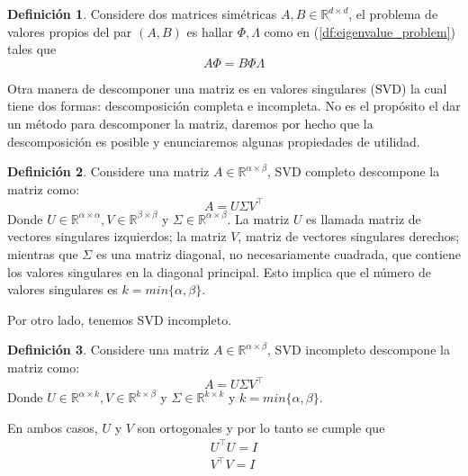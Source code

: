 \documentclass{article}
\numberwithin{equation}{section}
\theoremstyle{remark}
\theoremstyle{definition}
\newtheorem{definition}{Definición}
\theoremstyle{remark}
\theoremstyle{remark}
\begin{document}
\begin{definition}
    \label{df:generalized_eigenvalue_problem}
    Considere dos matrices simétricas $A, B \in \mathbb{R}^{d \times d}$, el problema de 
    valores propios del par $(A, B)$ es hallar $\Phi, \Lambda$ como en (\ref{df:eigenvalue_problem})
    tales que
    \begin{equation}
    \label{eq:generalized_eigenvalue_problem}
        A \Phi = B \Phi \Lambda
    \end{equation}
\end{definition}

Otra manera de descomponer una matriz es en valores singulares (SVD) la cual tiene dos formas:
descomposición completa e incompleta. No es el propósito el dar un método para descomponer la matriz,
daremos por hecho que la descomposición es posible y enunciaremos algunas propiedades de utilidad.

\begin{definition}
    \label{df:complete_svd}
    Considere una matriz $A \in \mathbb{R}^{\alpha \times \beta}$, SVD completo descompone la matriz
    como:
    \begin{equation}
    \label{eq:complete_svd}
        A = U \Sigma V^\intercal
    \end{equation}
    Donde $U \in \mathbb{R}^{\alpha \times \alpha}, V \in \mathbb{R}^{\beta \times \beta}$ y
    $\Sigma \in \mathbb{R}^{\alpha \times \beta}$.
    La matriz $U$ es llamada matriz de vectores singulares izquierdos; la matriz $V$, matriz de 
    vectores singulares derechos; mientras que $\Sigma$ es una matriz diagonal, no necesariamente 
    cuadrada, que contiene los valores singulares en la diagonal principal. Esto implica que 
    el número de valores singulares es $k = min\{\alpha, \beta\}$.
\end{definition}

Por otro lado, tenemos SVD incompleto.

\begin{definition}
    \label{df:partial_svd}
    Considere una matriz $A \in \mathbb{R}^{\alpha \times \beta}$, SVD incompleto descompone 
    la matriz como:
    $$A = U \Sigma V^\intercal$$
    Donde $U \in \mathbb{R}^{\alpha \times k}, V \in \mathbb{R}^{k \times \beta}$ y
    $\Sigma \in \mathbb{R}^{k \times k}$ y $k = min\{\alpha, \beta\}$.
\end{definition}

En ambos casos, $U$ y $V$ son ortogonales  y por lo tanto se cumple que 
\begin{align*}
    U^\intercal U = I \\
    V^\intercal V = I 
\end{align*}
\end{document}
